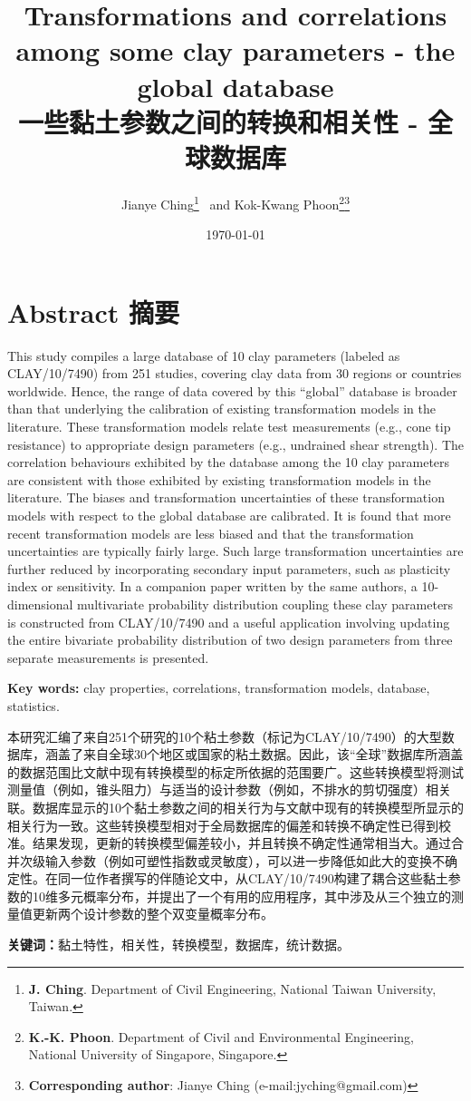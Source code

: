 \documentclass[onecolumn,10pt,UTF8]{ctexart}
\title{\textbf{Transformations and correlations among some clay parameters - the global database\\一些黏土参数之间的转换和相关性 - 全球数据库}}
\date{\today}
\author{Jianye Ching\thanks{
    \textbf{J. Ching}. Department of Civil Engineering, National Taiwan University, Taiwan.
} ~and Kok-Kwang Phoon\thanks{
    \textbf{K.-K. Phoon}. Department of Civil and Environmental Engineering, National University of Singapore, Singapore.
}\thanks{
    \textbf{Corresponding author}: Jianye Ching (e-mail:jyching@gmail.com)
}}
\begin{document}
\maketitle

\section*{Abstract 摘要}

\begin{Parallel}{0.60\textwidth}{}
    \ParallelLText
    {
        This study compiles a large database of 10 clay parameters (labeled as CLAY/10/7490) from 251 studies, covering clay data from 30 regions or countries worldwide. Hence, the range of data covered by this “global” database is broader than that underlying the calibration of existing transformation models in the literature. These transformation models relate test measurements (e.g., cone tip resistance) to appropriate design parameters (e.g., undrained shear strength). The correlation behaviours exhibited by the database among the 10 clay parameters are consistent with those exhibited by existing transformation models in the literature. The biases and transformation uncertainties of these transformation models with respect to the global database are calibrated. It is found that more recent transformation models are less biased and that the transformation uncertainties are typically fairly large. Such large transformation uncertainties are further reduced by incorporating secondary input parameters, such as plasticity index or sensitivity. In a companion paper written by the same authors, a 10-dimensional multivariate probability distribution coupling these clay parameters is constructed from CLAY/10/7490 and a useful application involving updating the entire bivariate probability distribution of two design parameters from three separate measurements is presented.

        \textbf{Key words: }clay properties, correlations, transformation models, database, statistics.
    }
    \ParallelRText
    {
        本研究汇编了来自251个研究的10个粘土参数（标记为CLAY/10/7490）的大型数据库，涵盖了来自全球30个地区或国家的粘土数据。因此，该“全球”数据库所涵盖的数据范围比文献中现有转换模型的标定所依据的范围要广。这些转换模型将测试测量值（例如，锥头阻力）与适当的设计参数（例如，不排水的剪切强度）相关联。数据库显示的10个黏土参数之间的相关行为与文献中现有的转换模型所显示的相关行为一致。这些转换模型相对于全局数据库的偏差和转换不确定性已得到校准。结果发现，更新的转换模型偏差较小，并且转换不确定性通常相当大。通过合并次级输入参数（例如可塑性指数或灵敏度），可以进一步降低如此大的变换不确定性。在同一位作者撰写的伴随论文中，从CLAY/10/7490构建了耦合这些黏土参数的10维多元概率分布，并提出了一个有用的应用程序，其中涉及从三个独立的测量值更新两个设计参数的整个双变量概率分布。

        \textbf{关键词：}黏土特性，相关性，转换模型，数据库，统计数据。
    }
\end{Parallel}
\end{document}
